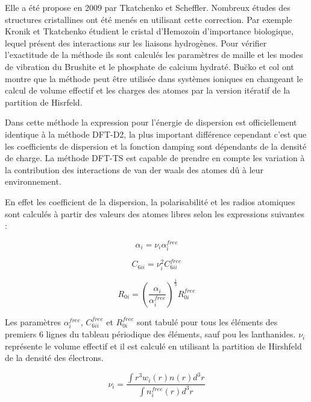 	Elle a été propose en 2009 par Tkatchenko et Scheffler\cite{tkatchenko2009accurate}. Nombreux études des structures cristallines ont été menés en utilisant cette correction. Par exemple Kronik et Tkatchenko\cite{kronik2014understanding} étudient le cristal d'Hemozoin d'importance biologique, lequel présent des interactions sur les liaisons hydrogènes. Pour vérifier l'exactitude de la méthode ils sont calculés les paramètres de maille et les modes de vibration du Brushite et le phosphate de calcium hydraté. Bu\u{c}ko et col\cite{buvcko2014extending} ont montre que la méthode peut être utilisée dans systèmes ioniques en changeant le calcul de volume effectif et les charges des atomes par la version itératif de la partition de Hisrfeld.
	
	Dans cette méthode la expression pour l'énergie de dispersion est officiellement identique à la méthode DFT-D2, la plus important différence cependant c'est que les coefficients de dispersion et la fonction damping sont dépendants de la densité de charge. La méthode DFT-TS est capable de prendre en compte les variation à la contribution des interactions de van der waals des atomes dû à leur environnement. 
	
	En effet les coefficient de la dispersion, la polarisabilité et les radios atomiques sont calculés à partir des valeurs des atomes libres selon les expressions suivantes :
	
	\begin{equation}
	\alpha_{i} = \nu_{i} \alpha_{i}^{free}
	\end{equation}
	
	\begin{equation}
	C_{6ii} = \nu_{i}^{2} C_{6ii}^{free}
	\end{equation}
	
	\begin{equation}
	R_{0i} = \left(\frac{\alpha_{i}}{\alpha_{i}^{free}}\right)^{\frac{1}{3}} R_{0i}^{free}
	\end{equation}
	
	Les paramètres $\alpha_{i}^{free}$, $C_{6ii}^{free}$ et $R_{0i}^{free}$ sont tabulé pour tous les éléments des premiers 6 lignes du tableau périodique des éléments, sauf pou les lanthanides. $\nu_{i}$ représente le volume effectif et il est calculé en utilisant la partition de Hirshfeld de la densité des électrons. 
	
	\begin{equation}
	\nu_{i} = \frac{\int r^{3} w_{i}(r)n(r)d^{3}r}{\int n_{i}^{free} (r)d^{3}r}
	\end{equation}
	
